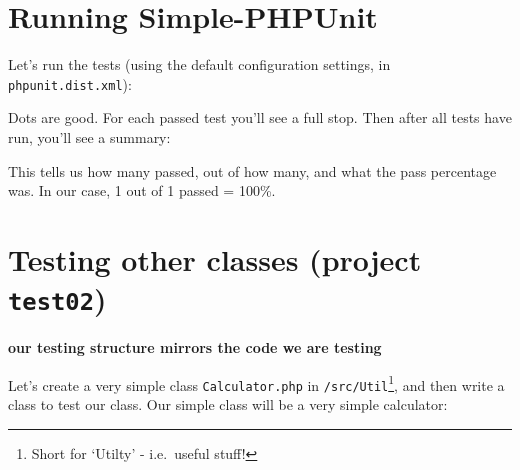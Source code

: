 \documentclass[a4paperpaper,openright]{book}
\newenvironment{Shaded}{}{}
\newcommand{\BuiltInTok}[1]{#1}
\newcommand{\ExtensionTok}[1]{#1}
\newcommand{\NormalTok}[1]{#1}
\begin{document}
\hypertarget{running-simple-phpunit}{%
\section{Running Simple-PHPUnit}\label{running-simple-phpunit}}

Let's run the tests (using the default configuration settings, in
\texttt{phpunit.dist.xml}):

\begin{Shaded}
\end{Shaded}

Dots are good. For each passed test you'll see a full stop. Then after
all tests have run, you'll see a summary:

\begin{Shaded}
\end{Shaded}

This tells us how many passed, out of how many, and what the pass
percentage was. In our case, 1 out of 1 passed = 100\%.

\hypertarget{testing-other-classes-project-test02}{%
\section{\texorpdfstring{Testing other classes (project
\texttt{test02})}{Testing other classes (project test02)}}\label{testing-other-classes-project-test02}}

\textbf{our testing structure mirrors the code we are testing}

Let's create a very simple class \texttt{Calculator.php} in
\texttt{/src/Util}\footnote{Short for `Utilty' - i.e.~useful stuff!},
and then write a class to test our class. Our simple class will be a
very simple calculator:
\end{document}
